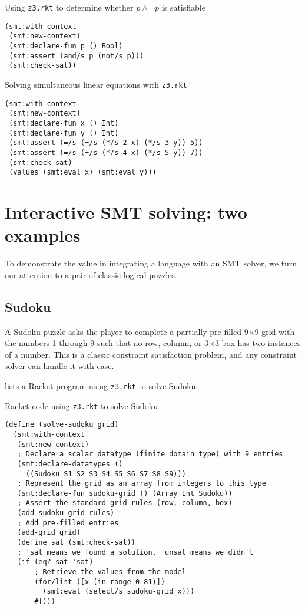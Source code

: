 \begin{program}
\caption{Using \texttt{z3.rkt} to determine whether $p \wedge \neg p$ is satisfiable}
\label{fig:rkt-prop}
\begin{verbatim}
(smt:with-context
 (smt:new-context)
 (smt:declare-fun p () Bool)
 (smt:assert (and/s p (not/s p)))
 (smt:check-sat))
\end{verbatim}
\end{program}

\begin{program}
\caption{Solving simultaneous linear equations with \texttt{z3.rkt}}
\label{fig:rkt-simultaneous}
\begin{verbatim}
(smt:with-context
 (smt:new-context)
 (smt:declare-fun x () Int)
 (smt:declare-fun y () Int)
 (smt:assert (=/s (+/s (*/s 2 x) (*/s 3 y)) 5))
 (smt:assert (=/s (+/s (*/s 4 x) (*/s 5 y)) 7))
 (smt:check-sat)
 (values (smt:eval x) (smt:eval y)))
\end{verbatim}
\end{program}

\section{Interactive SMT solving: two examples}
\label{sec:interactive}

To demonstrate the value in integrating a language with an SMT solver, we turn
our attention to a pair of classic logical puzzles.

\subsection{Sudoku}

A Sudoku puzzle asks the player to complete a partially pre-filled 9$\times$9
grid with the numbers 1 through 9 such that no row, column, or 3$\times$3 box
has two instances of a number. This is a classic constraint satisfaction
problem, and any constraint solver can handle it with ease.

 lists a Racket program using \texttt{z3.rkt} to solve Sudoku.

\begin{program}
\caption{Racket code using \texttt{z3.rkt} to solve Sudoku}
\label{fig:sudoku}
\begin{verbatim}
(define (solve-sudoku grid)
  (smt:with-context
   (smt:new-context)
   ; Declare a scalar datatype (finite domain type) with 9 entries
   (smt:declare-datatypes ()
     ((Sudoku S1 S2 S3 S4 S5 S6 S7 S8 S9)))
   ; Represent the grid as an array from integers to this type
   (smt:declare-fun sudoku-grid () (Array Int Sudoku))
   ; Assert the standard grid rules (row, column, box)
   (add-sudoku-grid-rules)
   ; Add pre-filled entries
   (add-grid grid)
   (define sat (smt:check-sat))
   ; 'sat means we found a solution, 'unsat means we didn't
   (if (eq? sat 'sat)
       ; Retrieve the values from the model
       (for/list ([x (in-range 0 81)])
         (smt:eval (select/s sudoku-grid x)))
       #f)))
\end{verbatim}
\end{program}

